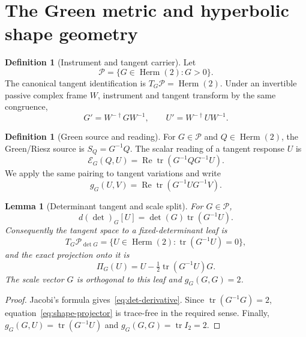 \documentclass[12pt]{article}
\newtheorem{lemma}[theorem]{Lemma}
\theoremstyle{definition}
\newtheorem{definition}[theorem]{Definition}
\theoremstyle{remark}
\newcommand{\Herm}{\operatorname{Herm}}
\newcommand{\Pos}{\mathcal P}
\newcommand{\tr}{\operatorname{tr}}
\begin{document}
\section{The Green metric and hyperbolic shape geometry}
\label{sec:green_metric}

\begin{definition}[Instrument and tangent carrier]\label{def:instrument-space}
Let
\[
 \Pos=\{G\in\Herm(2):G>0\}.
\]
The canonical tangent identification is $T_G\Pos=\Herm(2)$.  Under an
invertible passive complex frame $W$, instrument and tangent transform by the
same congruence,
\begin{equation}\label{eq:passive-congruence}
 G'=W^{-\dagger}GW^{-1},\qquad
 U'=W^{-\dagger}UW^{-1}.
\end{equation}
\end{definition}

\begin{definition}[Green source and reading]\label{def:green-reading}
For $G\in\Pos$ and $Q\in\Herm(2)$, the Green/Riesz source is
$S_Q=G^{-1}Q$.  The scalar reading of a tangent response $U$ is
\begin{equation}\label{eq:green-reading}
 \mathcal E_G(Q,U)
 =\operatorname{Re}\tr(G^{-1}QG^{-1}U).
\end{equation}
We apply the same pairing to tangent variations and write
\begin{equation}\label{eq:green-metric}
 g_G(U,V)=\operatorname{Re}\tr(G^{-1}UG^{-1}V).
\end{equation}
\end{definition}

\begin{lemma}[Determinant tangent and scale split]\label{lem:det-tangent}
For $G\in\Pos$,
\begin{equation}\label{eq:det-derivative}
 d(\det)_G[U]=\det(G)\tr(G^{-1}U).
\end{equation}
Consequently the tangent space to a fixed-determinant leaf is
\[
 T_G\Pos_{\det G}=\{U\in\Herm(2):\tr(G^{-1}U)=0\},
\]
and the exact projection onto it is
\begin{equation}\label{eq:shape-projector}
 \Pi_G(U)=U-\tfrac12\tr(G^{-1}U)G.
\end{equation}
The scale vector $G$ is orthogonal to this leaf and $g_G(G,G)=2$.
\end{lemma}

\begin{proof}
Jacobi's formula gives~\eqref{eq:det-derivative}.  Since
$\tr(G^{-1}G)=2$, equation~\eqref{eq:shape-projector} is trace-free in the
required sense.  Finally,
$g_G(G,U)=\tr(G^{-1}U)$ and $g_G(G,G)=\tr I_2=2$.
\end{proof}
\end{document}
